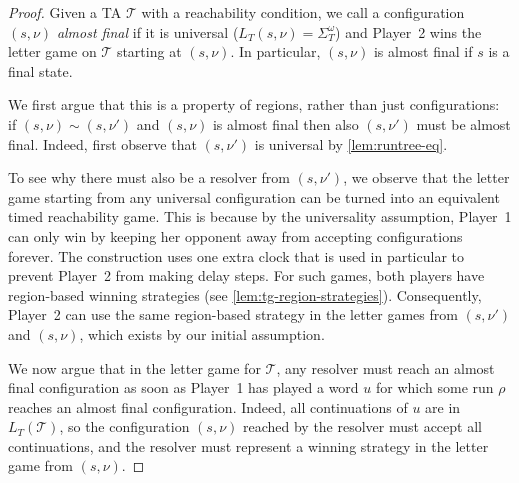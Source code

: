 \documentclass[10pt,a4paper]{amsart}
\theoremstyle{definition}
\numberwithin{equation}{section}
\newcommand{\T}{\mathcal{T}}
\newcommand{\lang}{L_T}  %
\newcommand{\req}{\sim}
\begin{document}
\begin{proof}
    Given a TA $\T$ with a reachability condition, we call a configuration $(s,\nu)$ \emph{almost final} if
    it is universal
    ($\lang(s,\nu)=\Sigma_T^\omega$)
    and
    Player~2 wins the letter game on $\T$ starting at $(s,\nu)$. 	
    In particular, $(s,\nu)$ is almost final if $s$ is a final state. 

We first argue that this is a property of regions, rather than just configurations:
if $(s,\nu)\req(s,\nu')$ and $(s,\nu)$ is almost final then also $(s,\nu')$ must be almost final.
Indeed, first observe that $(s,\nu')$ is universal by \cref{lem:runtree-eq}. 

To see why there must also be a resolver from $(s,\nu')$,
we observe that the letter game starting from any universal configuration
can be turned into an equivalent timed reachability game.
This is because by the universality assumption, Player~1 can only win by
keeping her opponent away from accepting configurations forever.
The construction uses one extra clock that is used in particular to prevent Player~2 from making delay steps.
For such games, both players have region-based winning strategies (see \cref{lem:tg-region-strategies}).
Consequently, Player~2 can use the same region-based strategy in the letter games
from $(s,\nu')$ and $(s,\nu)$, which exists by our initial assumption.



We now argue that in the letter game for $\T$,
any resolver must reach an almost final configuration as soon as Player~1 has played a word $u$ for which some run $\rho$ reaches an almost final configuration. Indeed, all continuations of $u$ are in $\lang(\T)$, so the configuration $(s,\nu)$ reached by the resolver must accept all continuations, and the resolver must represent a winning strategy in the letter game from $(s,\nu)$.


\end{proof}
\end{document}
